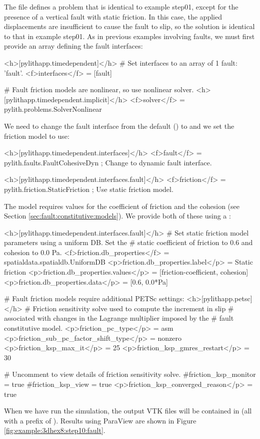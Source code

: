 The  file defines a problem that is identical to
example step01, except for the presence of a vertical fault with static
friction. In this case, the applied displacements are insufficient
to cause the fault to slip, so the solution is identical to that in
example step01. As in previous examples involving faults, we must
first provide an array defining the fault interfaces:
\begin{cfg}
<h>[pylithapp.timedependent]</h>
# Set interfaces to an array of 1 fault: 'fault'.
<f>interfaces</f> = [fault]

# Fault friction models are nonlinear, so use nonlinear solver.
<h>[pylithapp.timedependent.implicit]</h>
<f>solver</f> = pylith.problems.SolverNonlinear
\end{cfg}
We need to change the fault interface from the default ()
to  and we set the friction model to use:
\begin{cfg}
<h>[pylithapp.timedependent.interfaces]</h>
<f>fault</f> = pylith.faults.FaultCohesiveDyn ; Change to dynamic fault interface.

<h>[pylithapp.timedependent.interfaces.fault]</h>
<f>friction</f> = pylith.friction.StaticFriction ; Use static friction model.
\end{cfg}
The  model requires values for the coefficient
of friction and the cohesion (see Section \vref{sec:fault:constitutive:models}).
We provide both of these using a :
\begin{cfg}
<h>[pylithapp.timedependent.interfaces.fault]</h>
# Set static friction model parameters using a uniform DB. Set the
# static coefficient of friction to 0.6 and cohesion to 0.0 Pa.
<f>friction.db_properties</f> = spatialdata.spatialdb.UniformDB
<p>friction.db_properties.label</p> = Static friction
<p>friction.db_properties.values</p> = [friction-coefficient, cohesion]
<p>friction.db_properties.data</p> = [0.6, 0.0*Pa]

# Fault friction models require additional PETSc settings:
<h>[pylithapp.petsc]</h>
# Friction sensitivity solve used to compute the increment in slip
# associated with changes in the Lagrange multiplier imposed by the
# fault constitutive model.
<p>friction_pc_type</p> = asm
<p>friction_sub_pc_factor_shift_type</p> = nonzero
<p>friction_ksp_max_it</p> = 25
<p>friction_ksp_gmres_restart</p> = 30

# Uncomment to view details of friction sensitivity solve.
#friction_ksp_monitor = true
#friction_ksp_view = true
<p>friction_ksp_converged_reason</p> = true
\end{cfg}
When we have run the simulation, the output VTK files will be contained
in  (all with a prefix of ).
Results using ParaView are shown in Figure \vref{fig:example:3dhex8:step10:fault}.

